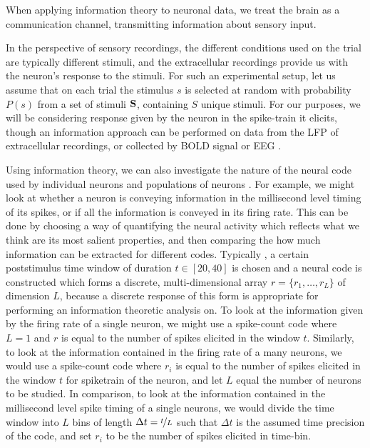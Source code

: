 When applying information theory to neuronal data, we treat the brain as a communication channel, transmitting information about sensory input.

In the perspective of sensory recordings, the different conditions used on the trial are typically different stimuli, and the extracellular recordings provide us with the neuron's response to the stimuli.
For such an experimental setup, let us assume that on each trial the stimulus $s$ is selected at random with probability $P(s)$ from a set of stimuli $\mathbf{S}$, containing $S$ unique stimuli.
For our purposes, we will be considering response given by the neuron in the spike-train it elicits, though an information approach can be performed on data from the \ac{LFP} of extracellular recordings, or collected by \ac{BOLD} signal or \ac{EEG} \cite{Magri2009,Quiroga2009}.

Using information theory, we can also investigate the nature of the neural code used by individual neurons and populations of neurons \cite{Optican1987}.
For example, we might look at whether a neuron is conveying information in the millisecond level timing of its spikes, or if all the information is conveyed in its firing rate.
This can be done by choosing a way of quantifying the neural activity which reflects what we think are its most salient properties, and then comparing the how much information can be extracted for different codes.
Typically \cite{Quiroga2009,Brasselet2012,Panzeri2007,Arabzadeh2006,Strong1998}, a certain poststimulus time window of duration $t \in [20,40]$ is chosen and a neural code is constructed which forms a discrete, multi-dimensional array $r = \{r_1, \ldots, r_L\}$ of dimension $L$, because a discrete response of this form is appropriate for performing an information theoretic analysis on.
To look at the information given by the firing rate of a single neuron, we might use a spike-count code where $L=1$ and $r$ is equal to the number of spikes elicited in the window $t$.
Similarly, to look at the information contained in the firing rate of a many neurons, we would use a spike-count code where $r_i$ is equal to the number of spikes elicited in the window $t$ for spiketrain of the  neuron, and let $L$ equal the number of neurons to be studied.
In comparison, to look at the information contained in the millisecond level spike timing of a single neurons, we would divide the time window into $L$ bins of length $\Delta t = \nicefrac{t}{L}$ such that $\Delta t$ is the assumed time precision of the code, and set $r_i$ to be the number of spikes elicited in  time-bin.

